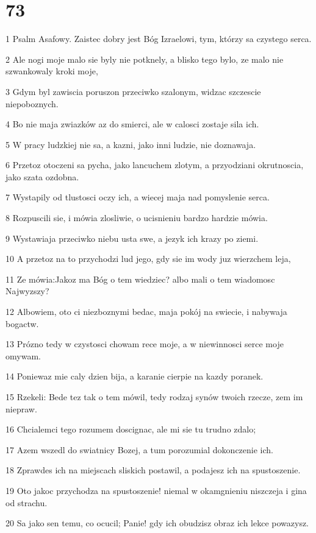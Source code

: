 \chapter{73}

\par 1 Psalm Asafowy. Zaistec dobry jest Bóg Izraelowi, tym, którzy sa czystego serca.
\par 2 Ale nogi moje malo sie byly nie potknely, a blisko tego bylo, ze malo nie szwankowaly kroki moje,
\par 3 Gdym byl zawiscia poruszon przeciwko szalonym, widzac szczescie niepoboznych.
\par 4 Bo nie maja zwiazków az do smierci, ale w calosci zostaje sila ich.
\par 5 W pracy ludzkiej nie sa, a kazni, jako inni ludzie, nie doznawaja.
\par 6 Przetoz otoczeni sa pycha, jako lancuchem zlotym, a przyodziani okrutnoscia, jako szata ozdobna.
\par 7 Wystapily od tlustosci oczy ich, a wiecej maja nad pomyslenie serca.
\par 8 Rozpuscili sie, i mówia zlosliwie, o ucisnieniu bardzo hardzie mówia.
\par 9 Wystawiaja przeciwko niebu usta swe, a jezyk ich krazy po ziemi.
\par 10 A przetoz na to przychodzi lud jego, gdy sie im wody juz wierzchem leja,
\par 11 Ze mówia:Jakoz ma Bóg o tem wiedziec? albo mali o tem wiadomosc Najwyzszy?
\par 12 Albowiem, oto ci niezboznymi bedac, maja pokój na swiecie, i nabywaja bogactw.
\par 13 Prózno tedy w czystosci chowam rece moje, a w niewinnosci serce moje omywam.
\par 14 Poniewaz mie caly dzien bija, a karanie cierpie na kazdy poranek.
\par 15 Rzekeli: Bede tez tak o tem mówil, tedy rodzaj synów twoich rzecze, zem im niepraw.
\par 16 Chcialemci tego rozumem doscignac, ale mi sie tu trudno zdalo;
\par 17 Azem wszedl do swiatnicy Bozej, a tum porozumial dokonczenie ich.
\par 18 Zprawdes ich na miejscach sliskich postawil, a podajesz ich na spustoszenie.
\par 19 Oto jakoc przychodza na spustoszenie! niemal w okamgnieniu niszczeja i gina od strachu.
\par 20 Sa jako sen temu, co ocucil; Panie! gdy ich obudzisz obraz ich lekce powazysz.
